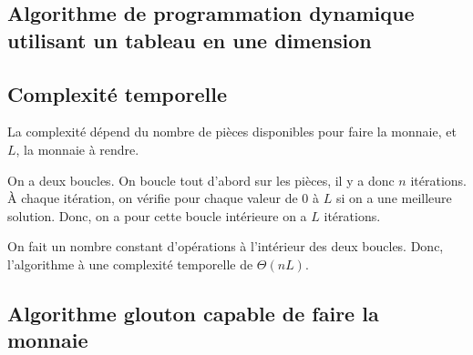\documentclass[10.9pt]{article} %
\begin{document}
\subsection{Algorithme de programmation dynamique utilisant un tableau en une dimension}

\begin{algorithm}
\end{algorithm}

\subsection{Complexité temporelle}

La complexité dépend du nombre de pièces disponibles pour faire la monnaie, et $L$, la monnaie
à rendre.

On a deux boucles. On boucle tout d'abord sur les pièces, il y a donc $n$ itérations.
À chaque itération, on vérifie pour chaque valeur de $0$ à $L$ si on a une meilleure solution.
Donc, on a pour cette boucle intérieure on a $L$ itérations. 

On fait un nombre constant d'opérations à l'intérieur des deux boucles. Donc, 
l'algorithme à une complexité temporelle de $\Theta(nL)$.
\newpage
\subsection{Algorithme glouton capable de faire la monnaie}
\end{document}
